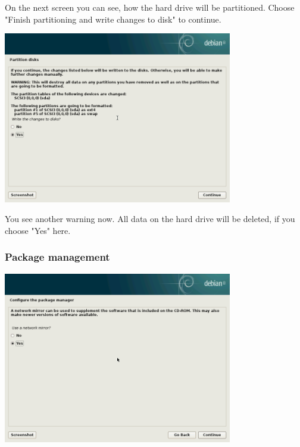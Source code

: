 \documentclass[a4paper,12pt,twoside]{article}
\begin{document}
On the next screen you can see, how the hard drive will be partitioned.
Choose "Finish partitioning and write changes to disk" to continue.

\bigskip
\begin{minipage}{\linewidth}
    \centering
    \captionsetup{type=figure}
    \includegraphics[width=10cm]{screenshots/confirm_partitioning.png}
    \label{fig:conf_write_hdd}
\end{minipage}
\bigskip

You see another warning now. All data on the hard drive will be deleted,
if you choose "Yes" here.


\subsubsection{Package management}
\label{sct:package_management}

\bigskip
\begin{minipage}{\linewidth}
    \centering
    \captionsetup{type=figure}
    \includegraphics[width=10cm]{screenshots/use_mirror.png}
    \label{fig:use_mirror}
\end{minipage}
\bigskip
\end{document}
